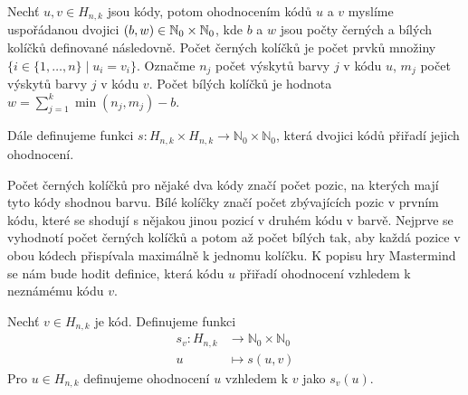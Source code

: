 \begin{definice}[Ohodnocení]\label{ohodnoceni}
  Nechť $u,v \in H_{n,k}$ jsou kódy, potom ohodnocením kódů $u$ a $v$ myslíme uspořádanou dvojici $(b,w) \in \mathbb{N}_0 \times \mathbb{N}_0$, kde $b$ a $w$ jsou počty černých a bílých kolíčků definované následovně. Počet černých kolíčků je počet prvků množiny $\{i \in \{1,\dots, n\}\mid  u_i = v_i \}$. Označme $n_j$ počet výskytů barvy $j$ v kódu $u$, $m_j$ počet výskytů barvy $j$ v kódu $v$. Počet bílých kolíčků je hodnota $w = \sum_{j = 1}^k \min(n_j, m_j)-b$.

  Dále definujeme funkci $s \colon H_{n,k} \times H_{n,k} \to \mathbb{N}_0\times \mathbb{N}_0$, která dvojici kódů přiřadí jejich ohodnocení.
\end{definice}
Počet černých kolíčků pro nějaké dva kódy značí počet pozic, na kterých mají tyto kódy shodnou barvu. Bílé kolíčky značí počet zbývajících pozic v prvním kódu, které se shodují s nějakou jinou pozicí v druhém kódu v barvě. Nejprve se vyhodnotí počet černých kolíčků a potom až počet bílých tak, aby každá pozice v obou kódech přispívala maximálně k jednomu kolíčku. K popisu hry Mastermind se nám bude hodit definice, která kódu $u$ přiřadí ohodnocení vzhledem k neznámému kódu $v$. 

\begin{definice}
  Nechť $v \in H_{n,k}$ je kód. Definujeme funkci
  \begin{align*}
        s_v \colon H_{n,k} &\to \mathbb{N}_0\times \mathbb{N}_0 \\
        u &\mapsto s(u,v)
  \end{align*}
  Pro $u\in H_{n,k}$ definujeme ohodnocení $u$ vzhledem k $v$ jako $s_v(u)$.
\end{definice}


